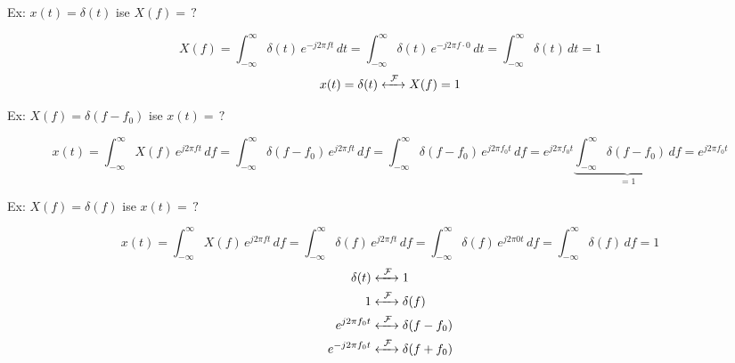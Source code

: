 \documentclass[11pt,a4paper]{article}
\begin{document}
\begin{ornek}
Ex: $x(t)=\delta(t)$ ise $X(f)=\,?$
\end{ornek}
\[ X(f)=\int_{-\infty}^{\infty}\delta(t)\,e^{-j2\pi ft}\,dt=\int_{-\infty}^{\infty}\delta(t)\,e^{-j2\pi f\cdot 0}\,dt=\int_{-\infty}^{\infty}\delta(t)\,dt=1 \]
\[ x(t)=\delta(t) \xleftrightarrow{\ \mathcal{F}\ } X(f)=1 \]
\begin{center}
\hspace{2cm}
\end{center}

\begin{ornek}
Ex: $X(f)=\delta(f-f_0)$ ise $x(t)=\,?$
\end{ornek}
\[ x(t)=\int_{-\infty}^{\infty} X(f)\,e^{j2\pi ft}\,df=\int_{-\infty}^{\infty}\delta(f-f_0)\,e^{j2\pi ft}\,df=\int_{-\infty}^{\infty}\delta(f-f_0)\,e^{j2\pi f_0t}\,df=e^{j2\pi f_0t}\underbrace{\int_{-\infty}^{\infty}\delta(f-f_0)\,df}_{=1}=e^{j2\pi f_0t} \]
\begin{ornek}
Ex: $X(f)=\delta(f)$ ise $x(t)=\,?$
\end{ornek}
\[ x(t)=\int_{-\infty}^{\infty} X(f)\,e^{j2\pi ft}\,df=\int_{-\infty}^{\infty}\delta(f)\,e^{j2\pi ft}\,df=\int_{-\infty}^{\infty}\delta(f)\,e^{j2\pi 0t}\,df=\int_{-\infty}^{\infty}\delta(f)\,df=1 \]
\begin{align*}
\delta(t) &\xleftrightarrow{\ \mathcal{F}\ } 1\\
1 &\xleftrightarrow{\ \mathcal{F}\ } \delta(f)\\
e^{j2\pi f_0t} &\xleftrightarrow{\ \mathcal{F}\ } \delta(f-f_0)\\
e^{-j2\pi f_0t} &\xleftrightarrow{\ \mathcal{F}\ } \delta(f+f_0)
\end{align*}
\end{document}
